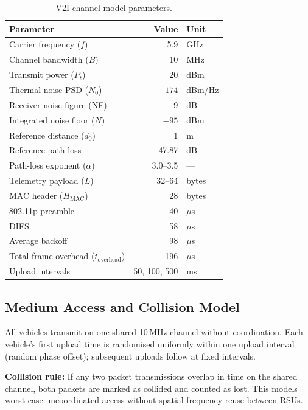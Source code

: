 \documentclass[12pt, a4paper]{article}
\begin{document}
\begin{table}[H]
\centering
\caption{V2I channel model parameters.}
\label{tab:params}
\begin{tabular}{lrl}
    \toprule
    \textbf{Parameter} & \textbf{Value} & \textbf{Unit} \\
    \midrule
    Carrier frequency ($f$)       & 5.9   & GHz \\
    Channel bandwidth ($B$)       & 10    & MHz \\
    Transmit power ($P_t$)        & 20    & dBm \\
    Thermal noise PSD ($N_0$)     & $-174$  & dBm/Hz \\
    Receiver noise figure (NF)    & 9     & dB \\
    Integrated noise floor ($N$)  & $-95$   & dBm \\
    Reference distance ($d_0$)    & 1     & m \\
    Reference path loss           & 47.87 & dB \\
    Path-loss exponent ($\alpha$) & 3.0--3.5 & --- \\
    Telemetry payload ($L$)       & 32--64   & bytes \\
    MAC header ($H_{\text{MAC}}$)   & 28       & bytes \\
    802.11p preamble               & 40       & $\mu$s \\
    DIFS                           & 58       & $\mu$s \\
    Average backoff                & 98       & $\mu$s \\
    Total frame overhead ($t_{\text{overhead}}$) & 196 & $\mu$s \\
    Upload intervals              & 50, 100, 500 & ms \\
    \bottomrule
\end{tabular}
\end{table}

\subsection{Medium Access and Collision Model}

All vehicles transmit on one shared 10\,MHz channel without coordination.
Each vehicle's first upload time is randomised uniformly within one upload
interval (random phase offset); subsequent uploads follow at fixed intervals.

\textbf{Collision rule:} If any two packet transmissions overlap in time on
the shared channel, both packets are marked as collided and counted as lost.
This models worst-case uncoordinated access without spatial frequency reuse
between RSUs.
\end{document}
